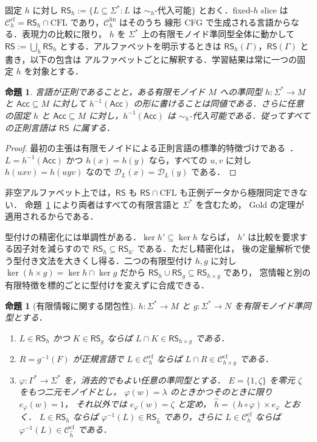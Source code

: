 \documentclass[11pt,a4paper]{ltjsarticle}
\newtheorem{proposition}[theorem]{命題}
\theoremstyle{remark}
\theoremstyle{plain}
\newcommand{\D}{\mathcal{D}}
\newcommand{\cf}{\mathrm{cf}}
\newcommand{\lin}{\mathrm{lin}}
\newcommand{\Ccf}[1]{\mathcal C_{#1}^{\cf}}
\newcommand{\Clin}[1]{\mathcal C_{#1}^{\lin}}
\begin{document}
固定 $h$ に対し
$\mathsf{RS}_h:=\{L\subseteq\Sigma^*:L\text{ は $\sim_h$-代入可能}\}$
とおく．fixed-$h$ slice は
$\Ccf{h}=\mathsf{RS}_h\cap\mathrm{CFL}$ であり，$\Clin{h}$ はそのうち
線形 CFG で生成される言語からなる．表現力の比較に限り，
$h$ を $\Sigma^*$ 上の有限モノイド準同型全体に動かして
$\mathsf{RS}:=\bigcup_h\mathsf{RS}_h$ とする．アルファベットを明示するときは
$\mathsf{RS}_h(\Gamma)$，$\mathsf{RS}(\Gamma)$ と書き，以下の包含は
アルファベットごとに解釈する．学習結果は常に一つの固定 $h$ を対象とする．

\begin{proposition}\label{prop:regular-auto}
言語が正則であることと，ある有限モノイド $M$ への準同型
$h:\Sigma^*\to M$ と $\mathsf{Acc}\subseteq M$ に対して
$h^{-1}(\mathsf{Acc})$ の形に書けることは同値である．さらに任意の固定 $h$ と
$\mathsf{Acc}\subseteq M$ に対し，$h^{-1}(\mathsf{Acc})$ は
$\sim_h$-代入可能である．従ってすべての正則言語は $\mathsf{RS}$ に属する．
\end{proposition}

\begin{proof}
最初の主張は有限モノイドによる正則言語の標準的特徴づけである~\cite{pin2025}．
$L=h^{-1}(\mathsf{Acc})$ かつ $h(x)=h(y)$ なら，すべての $u,v$ に対し
$h(uxv)=h(uyv)$ なので $\D_L(x)=\D_L(y)$ である．
\end{proof}

非空アルファベット上では，$\mathsf{RS}$ も
$\mathsf{RS}\cap\mathrm{CFL}$ も正例データから極限同定できない．
命題~\ref{prop:regular-auto} により両者はすべての有限言語と $\Sigma^*$ を含むため，
Gold の定理が適用されるからである．

型付けの精密化には単調性がある．$\ker h'\subseteq\ker h$ ならば，
$h'$ は比較を要求する因子対を減らすので
$\mathsf{RS}_h\subseteq\mathsf{RS}_{h'}$ である．ただし精密化は，
後の定量解析で使う型付き文法を大きくし得る．二つの有限型付け $h,g$ に対し
$\ker(h\times g)=\ker h\cap\ker g$ だから
$\mathsf{RS}_h\cup\mathsf{RS}_g\subseteq\mathsf{RS}_{h\times g}$ であり，
窓情報と別の有限特徴を標的ごとに型付けを変えずに合成できる．

\begin{proposition}[有限情報に関する閉包性]\label{prop:finite-info-closure}
$h:\Sigma^*\to M$ と $g:\Sigma^*\to N$ を有限モノイド準同型とする．
\begin{enumerate}[label=\textup{(\roman*)},nosep]
\item $L\in\mathsf{RS}_h$ かつ $K\in\mathsf{RS}_g$ ならば
$L\cap K\in\mathsf{RS}_{h\times g}$ である．
\item $R=g^{-1}(F)$ が正規言語で $L\in\Ccf{h}$ ならば
$L\cap R\in\Ccf{h\times g}$ である．
\item $\varphi:\Gamma^*\to\Sigma^*$ を，消去的でもよい任意の準同型とする．
$E=\{1,\zeta\}$ を零元 $\zeta$ をもつ二元モノイドとし，
$\varphi(w)=\lambda$ のときかつそのときに限り $e_\varphi(w)=1$，
それ以外では $e_\varphi(w)=\zeta$ と定め，
$\widehat h=(h\circ\varphi)\times e_\varphi$ とおく．
$L\in\mathsf{RS}_h$ ならば
$\varphi^{-1}(L)\in\mathsf{RS}_{\widehat h}$ であり，さらに
$L\in\Ccf{h}$ ならば
$\varphi^{-1}(L)\in\Ccf{\widehat h}$ である．
\end{enumerate}
\end{proposition}
\end{document}
